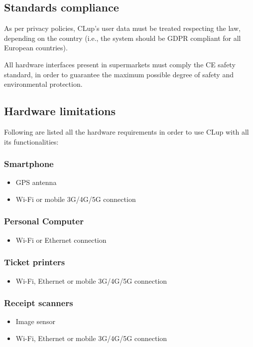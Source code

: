\documentclass[../../main.tex]{subfiles}
\begin{document}
	\subsection{Standards compliance}

	As per privacy policies, CLup's user data must be treated respecting the law, depending on the 
	country (i.e., the system should be GDPR compliant for all European countries).

	All hardware interfaces present in supermarkets must comply the CE safety standard, in order to guarantee 
	the maximum possible degree of safety and environmental protection.

	\subsection{Hardware limitations}

	Following are listed all the hardware requirements in order to use CLup with all its functionalities:

	\subsubsection*{Smartphone}
	\begin{itemize}

		\item GPS antenna

		\item Wi-Fi or mobile 3G/4G/5G connection

	\end{itemize}

	\subsubsection*{Personal Computer}
	\begin{itemize}

		\item Wi-Fi or Ethernet connection

	\end{itemize}

	\subsubsection*{Ticket printers}
	\begin{itemize}

		\item Wi-Fi, Ethernet or mobile 3G/4G/5G connection

	\end{itemize}

	\subsubsection*{Receipt scanners}
	\begin{itemize}

		\item Image sensor

		\item Wi-Fi, Ethernet or mobile 3G/4G/5G connection

	\end{itemize}
	
\end{document}
